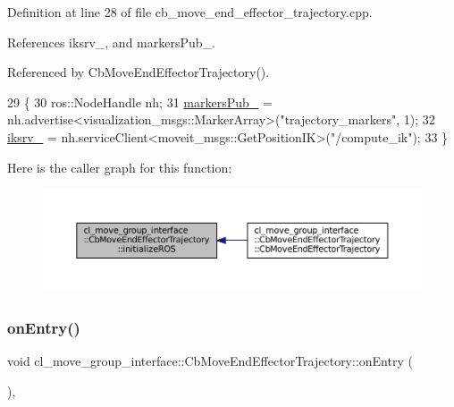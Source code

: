 Definition at line 28 of file cb\+\_\+move\+\_\+end\+\_\+effector\+\_\+trajectory.\+cpp.



References iksrv\+\_\+, and markers\+Pub\+\_\+.



Referenced by Cb\+Move\+End\+Effector\+Trajectory().


\begin{DoxyCode}
29     \{
30         ros::NodeHandle nh;
31         \hyperlink{classcl__move__group__interface_1_1CbMoveEndEffectorTrajectory_aabc2216b2d8625fecd83c5ec69928e63}{markersPub\_} = nh.advertise<visualization\_msgs::MarkerArray>(\textcolor{stringliteral}{"trajectory\_markers"}, 1);
32         \hyperlink{classcl__move__group__interface_1_1CbMoveEndEffectorTrajectory_a8a2e2225a5b53325241e45e4e28fa3a7}{iksrv\_} = nh.serviceClient<moveit\_msgs::GetPositionIK>(\textcolor{stringliteral}{"/compute\_ik"});
33     \}
\end{DoxyCode}
Here is the caller graph for this function\+:
\nopagebreak
\begin{figure}[H]
\begin{center}
\leavevmode
\includegraphics[width=350pt]{classcl__move__group__interface_1_1CbMoveEndEffectorTrajectory_afcee8f3853a5cef8806137a304c8a14b_icgraph}
\end{center}
\end{figure}
\mbox{\label{classcl__move__group__interface_1_1CbMoveEndEffectorTrajectory_aaedd074fd178c6390a4a3f1ccff23ad3}} 
\subsubsection{\texorpdfstring{on\+Entry()}{onEntry()}}
{\footnotesize\ttfamily void cl\+\_\+move\+\_\+group\+\_\+interface\+::\+Cb\+Move\+End\+Effector\+Trajectory\+::on\+Entry (\begin{DoxyParamCaption}{ }\end{DoxyParamCaption})\hspace{0.3cm}{\ttfamily [override]}, {\ttfamily [virtual]}}



